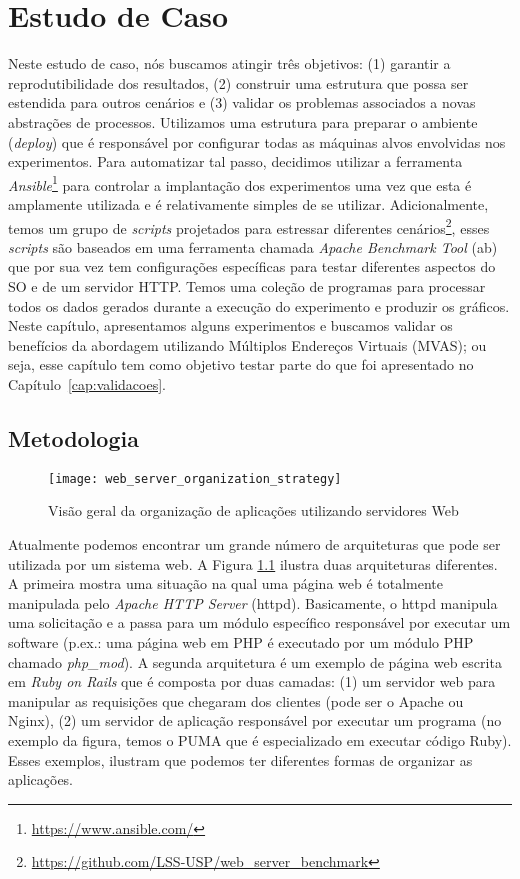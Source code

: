 \chapter{Estudo de Caso}
\label{cap:estudo-de-caso}

Neste estudo de caso, nós buscamos atingir três objetivos: (1) garantir a
reprodutibilidade dos resultados, (2) construir uma estrutura que possa ser
estendida para outros cenários e (3) validar os problemas associados a novas
abstrações de processos. Utilizamos uma estrutura para preparar o ambiente
(\emph{deploy}) que é responsável por configurar todas as máquinas alvos
envolvidas nos experimentos. Para automatizar tal passo, decidimos utilizar a
ferramenta \emph{Ansible}\footnote{\url{https://www.ansible.com/}} para
controlar a implantação dos experimentos uma vez que esta é amplamente
utilizada e é relativamente simples de se utilizar. Adicionalmente, temos um
grupo de \emph{scripts} projetados para estressar diferentes
cenários\footnote{\url{https://github.com/LSS-USP/web_server_benchmark}}, esses
\emph{scripts} são baseados em uma ferramenta chamada \emph{Apache Benchmark
Tool} (ab) que por sua vez tem configurações específicas para testar diferentes
aspectos do SO e de um servidor HTTP. Temos uma coleção de programas para
processar todos os dados gerados durante a execução do experimento e produzir
os gráficos. Neste capítulo, apresentamos alguns experimentos e buscamos
validar os benefícios da abordagem utilizando Múltiplos Endereços Virtuais
(MVAS); ou seja, esse capítulo tem como objetivo testar parte do que foi
apresentado no Capítulo~\ref{cap:validacoes}.

\section{Metodologia} \label{sec:metodologia}

\begin{figure}[!h] \centering
  \texttt{[image: web\_server\_organization\_strategy]}
  \caption{Visão geral da organização de aplicações utilizando servidores Web}
\label{fig:web_server} \end{figure}

Atualmente podemos encontrar um grande número de arquiteturas que pode ser
utilizada por um sistema web. A Figura \ref{fig:web_server} ilustra duas
arquiteturas diferentes. A primeira mostra uma situação na qual uma página web
é totalmente manipulada pelo \emph{Apache HTTP Server} (httpd). Basicamente, o httpd manipula uma
solicitação e a passa para um módulo específico responsável por executar um
software (p.ex.: uma página web em PHP é executado por um módulo PHP chamado
\emph{php\_mod}). A segunda arquitetura é um exemplo de página web escrita em
\emph{Ruby on Rails} que é composta por duas camadas: (1) um servidor web para
manipular as requisições que chegaram dos clientes (pode ser o Apache ou
Nginx), (2) um servidor de aplicação responsável por executar um programa (no
exemplo da figura, temos o PUMA que é especializado em executar código Ruby).
Esses exemplos, ilustram que podemos ter diferentes formas de organizar as
aplicações.

